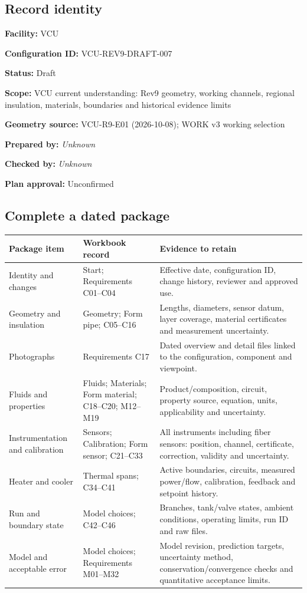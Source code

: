 \documentclass[11pt]{article}
\begin{document}
\subsection*{Record identity}
\textbf{Facility:} VCU\par
\textbf{Configuration ID:} VCU-REV9-DRAFT-007\par
\textbf{Status:} Draft\par
\textbf{Scope:} VCU current understanding: Rev9 geometry, working channels, regional insulation, materials, boundaries and historical evidence limits\par
\textbf{Geometry source:} VCU-R9-E01 (2026-10-08); WORK v3 working selection\par
\textbf{Prepared by:} \textit{Unknown}\par
\textbf{Checked by:} \textit{Unknown}\par
\textbf{Plan approval:} Unconfirmed\par
\subsection*{Complete a dated package}
\small\setlength{\tabcolsep}{4pt}
\begin{longtable}{>{\raggedright\arraybackslash}p{}>{\raggedright\arraybackslash}p{}>{\raggedright\arraybackslash}p{}}
\toprule
\textbf{Package item} & \textbf{Workbook record} & \textbf{Evidence to retain} \\\midrule\endhead
Identity and changes & Start; Requirements C01--C04 & Effective date, configuration ID, change history, reviewer and approved use. \\[3pt]
Geometry and insulation & Geometry; Form pipe; C05--C16 & Lengths, diameters, sensor datum, layer coverage, material certificates and measurement uncertainty. \\[3pt]
Photographs & Requirements C17 & Dated overview and detail files linked to the configuration, component and viewpoint. \\[3pt]
Fluids and properties & Fluids; Materials; Form material; C18--C20; M12--M19 & Product/composition, circuit, property source, equation, units, applicability and uncertainty. \\[3pt]
Instrumentation and calibration & Sensors; Calibration; Form sensor; C21--C33 & All instruments including fiber sensors: position, channel, certificate, correction, validity and uncertainty. \\[3pt]
Heater and cooler & Thermal spans; C34--C41 & Active boundaries, circuits, measured power/flow, calibration, feedback and setpoint history. \\[3pt]
Run and boundary state & Model choices; C42--C46 & Branches, tank/valve states, ambient conditions, operating limits, run ID and raw files. \\[3pt]
Model and acceptable error & Model choices; Requirements M01--M32 & Model revision, prediction targets, uncertainty method, conservation/convergence checks and quantitative acceptance limits. \\[3pt]
\bottomrule\end{longtable}\normalsize
\end{document}
